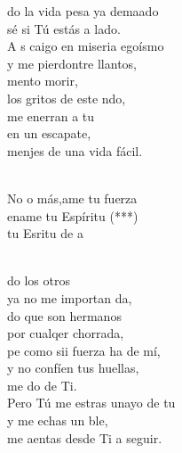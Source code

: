 \documentclass[12pt]{article}
\begin{document}
\begin{multicols*}{2}
\begin{cancion}%
	do la vida pesa ya demaado\\
	 sé si Tú estás a  lado.\\
	A s caigo en  miseria egoísmo\\
	y me pierdontre llantos, \\
	mento morir,\\
	los gritos de este ndo,\\
	me enerran a tu \\
	en un escapate, \\
	menjes de una vida fácil.\\\jump\\
	\begin{chorus}%
	No o más,ame tu fuerza\\
	ename tu Espíritu (***) \\
	tu Esritu de a \\
	\end{chorus}%
	\jump\\
	do los otros\\
	ya no me importan da,\\
	do que son hermanos \\
	por cualqer chorrada,\\
	pe como sii fuerza ha de mí,\\
	y no confíen tus huellas,  \\
	me do de Ti.\\
	Pero Tú me estras unayo de tu\\
	y me echas un ble, \\
	me aentas desde Ti a seguir.\\
\end{cancion}%


\end{multicols*}
\end{document}
